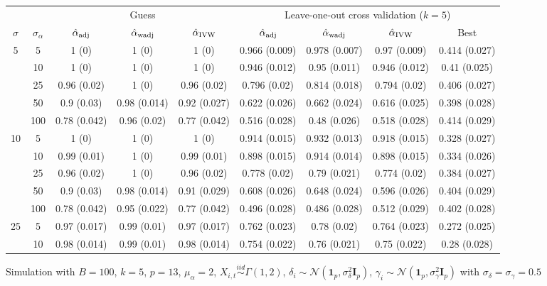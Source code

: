 \documentclass[10pt]{article}
\newcommand{\simiid}{\stackrel{iid}{\sim}} %
\def\normal#1#2{\mathcal{N}(#1,#2)} %
\theoremstyle{definition}
\begin{document}
\begin{sidewaysfigure}
\centering
\caption{Simulation  with $B = 100$, $k = 5$, $p = 13$, $\mu_{\alpha}=2$, $X_{i,t} \simiid \Gamma(1,2)$, $\delta_i \sim \normal{\mathbf{1}_p}{\sigma^2_{\delta}\mathbf{I}_p}$, $\gamma_i \sim \normal{\mathbf{1}_p}{\sigma^2_{\gamma}\mathbf{I}_p}$ with $\sigma_{\delta}=\sigma_{\gamma}=0.5$}
\begin{tabular}{cc|ccc|cccc}
  \hline 
   &  &  \multicolumn{3}{|c|}{Guess} & \multicolumn{4}{|c}{Leave-one-out cross validation ($k=5$)} \\ 
 $\sigma$   & $\sigma_{\alpha}$ & $\hat{\alpha}_{\rm adj}$  & $\hat{\alpha}_{\rm wadj}$ & $\hat{\alpha}_{\rm IVW}$ & $\hat{\alpha}_{\rm adj}$  & $\hat{\alpha}_{\rm wadj}$ & $\hat{\alpha}_{\rm IVW}$ &  Best \\[.3cm]  
  \hline
\multirow{5}{*}{5} & 5  & 1 (0) & 1 (0) & 1 (0) & 0.966 (0.009) & 0.978 (0.007) & 0.97 (0.009) & 0.414 (0.027) \\ 
    & 10 & 1 (0) & 1 (0) & 1 (0) & 0.946 (0.012) & 0.95 (0.011) & 0.946 (0.012) & 0.41 (0.025) \\ 
    & 25 & 0.96 (0.02) & 1 (0) & 0.96 (0.02) & 0.796 (0.02) & 0.814 (0.018) & 0.794 (0.02) & 0.406 (0.027) \\ 
    & 50 & 0.9 (0.03) & 0.98 (0.014) & 0.92 (0.027) & 0.622 (0.026) & 0.662 (0.024) & 0.616 (0.025) & 0.398 (0.028) \\ 
    & 100 & 0.78 (0.042) & 0.96 (0.02) & 0.77 (0.042) & 0.516 (0.028) & 0.48 (0.026) & 0.518 (0.028) & 0.414 (0.029) \\ 
   \multirow{5}{*}{10} & 5 & 1 (0) & 1 (0) & 1 (0) & 0.914 (0.015) & 0.932 (0.013) & 0.918 (0.015) & 0.328 (0.027) \\ 
   & 10 & 0.99 (0.01) & 1 (0) & 0.99 (0.01) & 0.898 (0.015) & 0.914 (0.014) & 0.898 (0.015) & 0.334 (0.026) \\ 
   & 25 & 0.96 (0.02) & 1 (0) & 0.96 (0.02) & 0.778 (0.02) & 0.79 (0.021) & 0.774 (0.02) & 0.384 (0.027) \\ 
    & 50 & 0.9 (0.03) & 0.98 (0.014) & 0.91 (0.029) & 0.608 (0.026) & 0.648 (0.024) & 0.596 (0.026) & 0.404 (0.029) \\ 
    & 100 & 0.78 (0.042) & 0.95 (0.022) & 0.77 (0.042) & 0.496 (0.028) & 0.486 (0.028) & 0.512 (0.029) & 0.402 (0.028) \\ 
   \multirow{5}{*}{25} & 5 & 0.97 (0.017) & 0.99 (0.01) & 0.97 (0.017) & 0.762 (0.023) & 0.78 (0.02) & 0.764 (0.023) & 0.272 (0.025) \\ 
    & 10 & 0.98 (0.014) & 0.99 (0.01) & 0.98 (0.014) & 0.754 (0.022) & 0.76 (0.021) & 0.75 (0.022) & 0.28 (0.028) \\ 

\end{tabular}
\end{sidewaysfigure}
\end{document}
